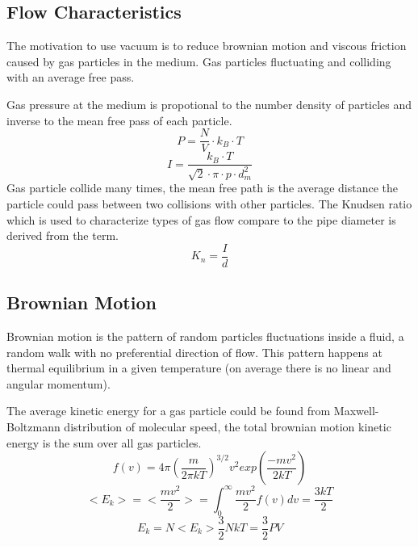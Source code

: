 \documentclass[\main/master.tex]{subfiles}
\begin{document}
\subsection{Flow Characteristics}
The motivation to use vacuum is to reduce brownian motion and viscous friction caused by gas particles in the medium. Gas particles fluctuating and colliding with an average free pass. 
\par
Gas pressure at the medium is propotional to the number density of particles and inverse to the mean free pass of each particle.    
\begin{equation}
P = \frac{N}{V}\cdot k_B\cdot T  \label{eqn:ideal-gasses}
\end{equation}
\begin{equation}
I = \frac{k_B\cdot T}{\sqrt{2}\cdot\pi\cdot p\cdot d_m^2}     \label{eqn:mean-free-pass}
\end{equation}
Gas particle collide many times, the mean free path is the average distance the particle could pass between two collisions with other particles. The Knudsen ratio which is used to characterize types of gas flow compare to the pipe diameter is derived from the term.
\begin{equation}
K_n = \frac{I}{d}     \label{eqn:mean-free-pass}
\end{equation}


\subsection{Brownian Motion}
Brownian motion is the pattern of random particles fluctuations inside a fluid, a random walk with no preferential direction of flow. This pattern happens at thermal equilibrium in a given temperature (on average there is no linear and angular momentum). 
\par
The average kinetic energy for a gas particle could be found from Maxwell-Boltzmann distribution of molecular speed, the total brownian motion kinetic energy is the sum over all gas particles.
\begin{equation}
f(v) = 4\pi(\frac{m}{2\pi kT})^{3/2}v^2exp(\frac{-mv^2}{2kT})     \label{eqn:Maxwell_Boltzmann}
\end{equation}  
\begin{equation}
<E_k>=<\frac{mv^2}{2}> = \int_{0}^{\infty}\frac{mv^2}{2}f(v)dv =  \frac{3kT}{2}    \label{eqn:avrage_kinetic}
\end{equation}
\begin{equation}
E_k=N<E_k> \frac{3}{2}NkT = \frac{3}{2}PV    \label{eqn:total_kinetic}
\end{equation}
\end{document}
